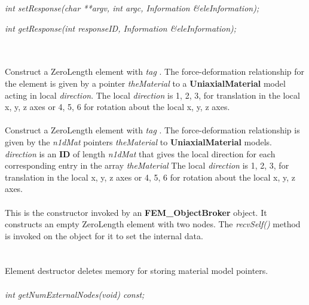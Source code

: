 {\em    int setResponse(char **argv, int argc, Information \&eleInformation);} 

{\em    int getResponse(int responseID, Information \&eleInformation);} 

    


  \\
 \\
Construct a ZeroLength element with {\em tag} .
The force-deformation relationship for the element is given by a pointer {\em theMaterial} to a
{\bf UniaxialMaterial} model acting in local {\em direction}.
The local {\em direction} is 1, 2, 3, for translation in the local x, y, z axes or 4, 5, 6 
for rotation about the local x, y, z axes. 
\\

 \\
Construct a ZeroLength element with {\em tag} .
The force-deformation relationship is given by the {\em n1dMat} pointers
{\em theMaterial} to {\bf UniaxialMaterial} models. 
{\em direction} is an {\bf ID}  of length {\em n1dMat} that gives
the local direction for each corresponding entry in the array {\em theMaterial}
The local {\em direction} is 1, 2, 3, for translation in the local x, y, z axes or 4, 5, 6 
for rotation about the local x, y, z axes. 
\\

 \\ 
This is the constructor invoked by an {\bf FEM\_ObjectBroker} object. It
constructs an empty ZeroLength element with two nodes.
The {\em recvSelf()} method is
invoked on the object for it to set the internal data. 
\\

 \\
 \\ 
Element destructor deletes memory for storing material model pointers. 
\\

  \\
{\em    int getNumExternalNodes(void) const;} 

